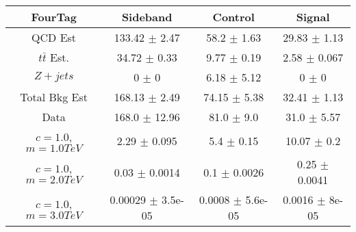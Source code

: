 \begin{footnotesize} 
\begin{tabular}{c|c|c|c} 
FourTag & Sideband & Control & Signal \\ 
\hline\hline 
QCD Est & 133.42 $\pm$ 2.47 & 58.2 $\pm$ 1.63 & 29.83 $\pm$ 1.13\\ 
$t\bar{t}$ Est.  & 34.72 $\pm$ 0.33 & 9.77 $\pm$ 0.19 & 2.58 $\pm$ 0.067\\ 
$Z+jets$ & 0 $\pm$ 0 & 6.18 $\pm$ 5.12 & 0 $\pm$ 0\\ 
Total Bkg Est & 168.13 $\pm$ 2.49 & 74.15 $\pm$ 5.38 & 32.41 $\pm$ 1.13\\ 
Data & 168.0 $\pm$ 12.96 & 81.0 $\pm$ 9.0 & 31.0 $\pm$ 5.57\\ 
$c=1.0$,$m=1.0TeV$ & 2.29 $\pm$ 0.095 & 5.4 $\pm$ 0.15 & 10.07 $\pm$ 0.2\\ 
$c=1.0$,$m=2.0TeV$ & 0.03 $\pm$ 0.0014 & 0.1 $\pm$ 0.0026 & 0.25 $\pm$ 0.0041\\ 
$c=1.0$,$m=3.0TeV$ & 0.00029 $\pm$ 3.5e-05 & 0.0008 $\pm$ 5.6e-05 & 0.0016 $\pm$ 8e-05\\ 
\hline\hline 
\end{tabular} 
\end{footnotesize} 
\newline 
